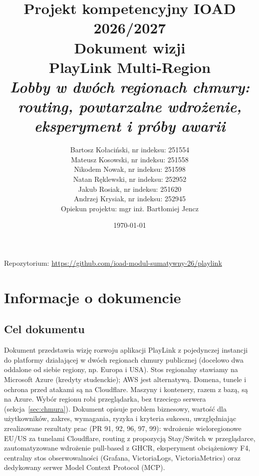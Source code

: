 \documentclass[12pt,a4paper]{article}
\title{
    \large Projekt kompetencyjny IOAD 2026/2027 \\[0.3em]
    \Huge \textbf{Dokument wizji} \\[0.3em]
    \LARGE PlayLink Multi-Region \\
    \large \textit{Lobby w dwóch regionach chmury: routing, powtarzalne wdrożenie, eksperyment i próby awarii}
}
\author{
    Bartosz Kołaciński, nr indeksu: 251554 \\
    Mateusz Kosowski, nr indeksu: 251558 \\
    Nikodem Nowak, nr indeksu: 251598 \\
    Natan Ręklewski, nr indeksu: 252952 \\
    Jakub Rosiak, nr indeksu: 251620 \\
    Andrzej Krysiak, nr indeksu: 252945 \\[0.6em]
    \normalsize Opiekun projektu: mgr inż. Bartłomiej Jencz
}
\date{\today}
\begin{document}
\maketitle
\vfill
\begin{center}
\small
Repozytorium: \url{https://github.com/ioad-modul-sumatywny-26/playlink}
\end{center}

\newpage
{}
\tableofcontents
\newpage

\section{Informacje o dokumencie}

\subsection{Cel dokumentu}
Dokument przedstawia wizję rozwoju aplikacji PlayLink z pojedynczej instancji do
platformy działającej w dwóch regionach chmury publicznej (docelowo dwa oddalone od siebie regiony, np. Europa i USA). Stos
regionalny stawiamy na Microsoft Azure (kredyty studenckie); AWS jest alternatywą.
Domena, tunele i ochrona przed atakami są na Cloudflare. Maszyny i kontenery,
razem z bazą, są na Azure. Wybór regionu robi przeglądarka,
bez trzeciego serwera (sekcja~\ref{sec:chmura}). Dokument opisuje
problem biznesowy, wartość dla użytkowników, zakres, wymagania, ryzyka i kryteria
sukcesu, uwzględniając zrealizowane rezultaty prac (PR 91, 92, 96, 97, 99): wdrożenie wieloregionowe EU/US za tunelami Cloudflare, routing z propozycją Stay/Switch w przeglądarce, zautomatyzowane wdrożenie pull-based z GHCR, eksperyment obciążeniowy F4, centralny stos obserwowalności (Grafana, VictoriaLogs, VictoriaMetrics) oraz dedykowany serwer Model Context Protocol (MCP).
\end{document}

